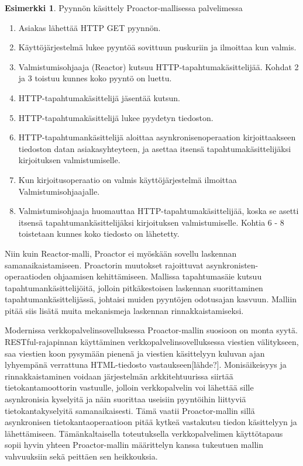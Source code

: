 \documentclass[finnish]{tktltiki2}
\theoremstyle{definition}
\newtheorem{esim}[lau]{Esimerkki}
\theoremstyle{remark}
\begin{document}
\begin{center}
    \begin{esim}\label{esim:proactor}
        Pyynnön käsittely Proactor-mallisessa palvelimessa~\cite{pyarali_proactor_1997} \\
        \begin{enumerate}
            \item Asiakas lähettää HTTP GET pyynnön.
            \item Käyttöjärjestelmä lukee pyyntöä sovittuun puskuriin ja ilmoittaa kun valmis.
            \item Valmistumisohjaaja (Reactor) kutsuu HTTP-tapahtumakäsittelijää.
                Kohdat 2 ja 3 toistuu kunnes koko pyyntö on luettu.
            \item HTTP-tapahtumakäsittelijä jäsentää kutsun.
            \item HTTP-tapahtumakäsittelijä lukee pyydetyn tiedoston.
            \item HTTP-tapahtumankäsittelijä aloittaa asynkronisenoperaation 
                kirjoittaakseen tiedoston datan asiakasyhteyteen, ja asettaa
                itsensä tapahtumakäsittelijäksi kirjoituksen valmistumiselle.
            \item Kun kirjoitusoperaatio on valmis käyttöjärjestelmä ilmoittaa
                Valmistumisohjaajalle.
            \item Valmistumisohjaaja huomauttaa HTTP-tapahtumakäsittelijää,
                koska se asetti itsensä tapahtumankäsittelijäksi kirjoituksen 
                valmistumiselle. Kohtia 6 - 8 toistetaan kunnes koko tiedosto on lähetetty. 
        \end{enumerate}
    \end{esim}
\end{center}
Niin kuin Reactor-malli, Proactor ei myöskään sovellu laskennan samanaikaistamiseen.
Proactorin muutokset rajoittuvat asynkronisten-operaatioden ohjaamisen 
kehittämiseen. Mallissa tapahtumasäie kutsuu tapahtumankäsittelijöitä, jolloin
pitkäkestoisen laskennan suorittaminen tapahtumankäsittelijässä, johtaisi
muiden pyyntöjen odotusajan kasvuun. Malliin pitää siis
lisätä muita mekanismeja laskennan rinnakkaistamiseksi.

Modernissa verkkopalvelinsovelluksessa Proactor-mallin suosioon on
monta syytä. RESTful-rajapinnan käyttäminen
verkkopalvelinsovelluksessa viestien välitykseen,
saa viestien koon pysymään pienenä ja viestien
käsittelyyn kuluvan ajan lyhyempänä verrattuna
HTML-tiedosto vastaukseen[lähde?]. %
Monisäikeisyys ja rinnakkaistaminen
voidaan järjestelmän arkkitehtuurissa siirtää tietokantamoottorin vastuulle,
jolloin verkkopalvelin voi lähettää sille asynkronisia kyselyitä
ja näin suorittaa useisiin pyyntöihin liittyviä tietokantakyselyitä
samanaikaisesti. Tämä vaatii Proactor-mallin sillä asynkronisen tietokantaoperaatioon
pitää kytkeä vastakutsu tiedon käsittelyyn ja lähettämiseen.
Tämänkaltaisella toteutuksella verkkopalvelimen käyttötapaus sopii
hyvin yhteen Proactor-mallin määrittelyn kanssa tukeutuen
mallin vahvuuksiin sekä peittäen sen heikkouksia.
\end{document}
